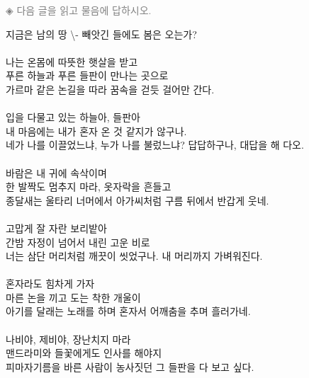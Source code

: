 \documentclass[10pt,a4paper]{article}
\begin{document}
\vspace{4mm}
{\small\textcolor{gray}{◈ 다음 글을 읽고 물음에 답하시오.}}
\vspace{2mm}
\begin{tcolorbox}[passage]
지금은 남의 땅 \textbackslash{}- 빼앗긴 들에도 봄은 오는가? \\{}
\vspace{4pt} \\{}
나는 온몸에 따뜻한 햇살을 받고   \\{}
푸른 하늘과 푸른 들판이 만나는 곳으로   \\{}
가르마 같은 논길을 따라 꿈속을 걷듯 걸어만 간다. \\{}
\vspace{4pt} \\{}
입을 다물고 있는 하늘아, 들판아   \\{}
내 마음에는 내가 혼자 온 것 같지가 않구나.   \\{}
네가 나를 이끌었느냐, 누가 나를 불렀느냐? 답답하구나, 대답을 해 다오. \\{}
\vspace{4pt} \\{}
바람은 내 귀에 속삭이며   \\{}
한 발짝도 멈추지 마라, 옷자락을 흔들고   \\{}
종달새는 울타리 너머에서 아가씨처럼 구름 뒤에서 반갑게 웃네. \\{}
\vspace{4pt} \\{}
고맙게 잘 자란 보리밭아   \\{}
간밤 자정이 넘어서 내린 고운 비로   \\{}
너는 삼단 머리처럼 깨끗이 씻었구나. 내 머리까지 가벼워진다. \\{}
\vspace{4pt} \\{}
혼자라도 힘차게 가자   \\{}
마른 논을 끼고 도는 착한 개울이   \\{}
아기를 달래는 노래를 하며 혼자서 어깨춤을 추며 흘러가네. \\{}
\vspace{4pt} \\{}
나비야, 제비야, 장난치지 마라   \\{}
맨드라미와 들꽃에게도 인사를 해야지   \\{}
피마자기름을 바른 사람이 농사짓던 그 들판을 다 보고 싶다. \\{}
\vspace{4pt} \\{}

\end{tcolorbox}
\end{document}
